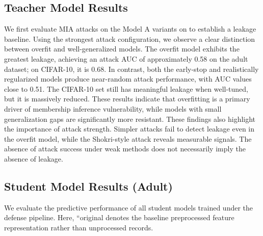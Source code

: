 \documentclass[conference]{IEEEtran}
\begin{document}
\subsection{Teacher Model Results}
We first evaluate MIA attacks on the Model A variants on to establish a leakage baseline. Using the strongest attack configuration, we observe a clear distinction between overfit and well-generalized models.
The overfit model exhibits the greatest leakage, achieving an attack AUC of approximately 0.58 on the adult dataset; on CIFAR-10, it is 0.68. In contrast, both the early-stop and realistically regularized models produce near-random attack performance, with AUC values close to 0.51. The CIFAR-10 set still has meaningful leakage when well-tuned, but it is massively reduced. These results indicate that overfitting is a primary driver of membership inference vulnerability, while models with small generalization gaps are significantly more resistant.
These findings also highlight the importance of attack strength. Simpler attacks fail to detect leakage even in the overfit model, while the Shokri-style attack reveals measurable signals. The absence of attack success under weak methods does not necessarily imply the absence of leakage.

\subsection{Student Model Results (Adult)}
We evaluate the predictive performance of all student models trained under the defense pipeline. Here, ``original denotes the baseline preprocessed feature representation rather than unprocessed records.
\end{document}
